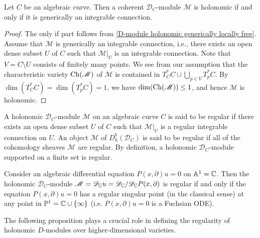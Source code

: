 \begin{lemma}\label{D-module on curve holonomic iff generaically locally free}
Let $C$ be an algebraic curve. Then a coherent $\mathscr{D}_C$-module $\mathscr{M}$ is holonomic if and only if it is generically an integrable connection.
\end{lemma}
\begin{proof}
The only if part follows from \cref{D-module holonomic generically locally free}. Assume that $\mathscr{M}$ is generically an integrable connection, i.e., there exists an open dense subset $U$ of $C$ such that $\mathscr{M}|_U$ is an integrable connection. Note that $V=C\setminus U$ consists of finitely many points. We see from our assumption that the characteristic variety $\mathrm{Ch}(\mathscr{M})$ of $\mathscr{M}$ is contained in $T^*_CC\cup\bigcup_{p\in V}T^*_pC$. By $\dim(T^*_CC)=\dim(T^*_pC)=1$, we have $\dim(\mathrm{Ch}(\mathscr{M}))\leq 1$, and hence $\mathscr{M}$ is holonomic.
\end{proof}

A holonomic $\mathscr{D}_C$-module $\mathscr{M}$ on an algebraic curve $C$ is said to be regular if there exists an open dense subset $U$ of $C$ such that $\mathscr{M}|_U$ is a regular integrable connection on $U$. An object $\mathscr{M}$ of $D^b_h(\mathscr{D}_C)$ is said to be regular if all of the cohomology sheaves $\mathscr{M}$ are regular. By definition, a holonomic $\mathscr{D}_C$-module supported on a finite set is regular.

\begin{example}
Consider an algebraic differential equation $P(x,\partial)u=0$ on $\mathbb{A}^1=\mathbb{C}$. Then the holonomic $\mathscr{D}_C$-module $\mathscr{M}=\mathscr{D}_{\mathbb{C}}u=\mathscr{D}_{\mathbb{C}}/\mathscr{D}_{\mathbb{C}}P(x,\partial)$ is regular if and only if the equation $P(x,\partial)u=0$ has a regular singular point (in the classical sense) at any point in $\mathbb{P}^1=\mathbb{C}\cup\{\infty\}$ (i.e. $P(x,\partial)u=0$ is a Fuchsian ODE).
\end{example}

The following proposition plays a crucial role in defining the regularity of holonomic $D$-modules over higher-dimensional varieties.

